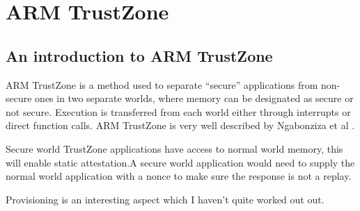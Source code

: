 \section{ARM TrustZone}

\subsection{An introduction to ARM TrustZone}

ARM TrustZone is a method used to separate “secure” applications from non-secure ones in two separate worlds, where memory can be designated as secure or not secure. Execution is transferred from each world either through interrupts or direct function calls. ARM TrustZone is very well described by Ngabonziza et al \cite{Ngabonziza2017}.

Secure world TrustZone applications have access to normal world memory, this will enable static attestation.A secure world application would need to supply the normal world application with a nonce to make sure the response is not a replay.

Provisioning is an interesting aspect which I haven’t quite worked out out.